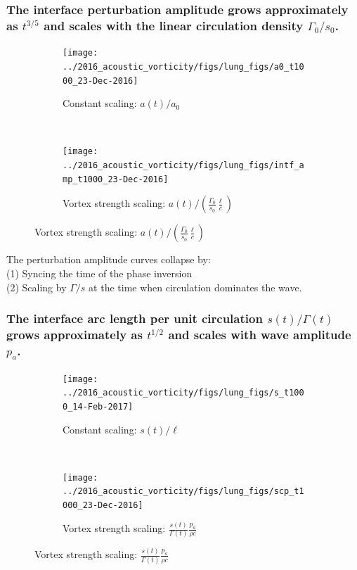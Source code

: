 %
%
\begin{frame}
  \frametitle{The interface perturbation amplitude grows approximately as $t^{3/5}$ and scales with the linear circulation density $\Gamma_0/s_0$.}
  \begin{figure}
    \centering
    \begin{subfigure}[t]{0.45\textwidth}
      \centering
      \texttt{[image: ../2016\_acoustic\_vorticity/figs/lung\_figs/a0\_t1000\_23-Dec-2016]}
      \caption{\label{fig:trapz_interface_t1000} Constant scaling: $a(t)/a_0$}
    \end{subfigure}
    ~
    \begin{subfigure}[t]{0.45\textwidth}
      \centering
      \texttt{[image: ../2016\_acoustic\_vorticity/figs/lung\_figs/intf\_amp\_t1000\_23-Dec-2016]}
      \caption{Vortex strength scaling: $a(t)/\left(\frac{\Gamma_0}{s_0}\frac{\ell}{c}\right)$}
    \end{subfigure}
  \end{figure}
  The perturbation amplitude curves collapse by:\\
  (1) Syncing the time of the phase inversion\\ 
  (2) Scaling by $\Gamma / s$ at the time when circulation dominates the wave.
\end{frame}
%
%
\begin{frame}
  \frametitle{The interface arc length per unit circulation $s(t)/\Gamma(t)$ grows approximately as $t^{1/2}$ and scales with wave amplitude $p_a$.}
  \begin{figure}
    \centering
    \begin{subfigure}[t]{0.45\textwidth}
      \centering
      \texttt{[image: ../2016\_acoustic\_vorticity/figs/lung\_figs/s\_t1000\_14-Feb-2017]}
      \caption{\label{fig:trapz_interface_t1000} Constant scaling: $s(t)/\ell$}
    \end{subfigure}
    ~
    \begin{subfigure}[t]{0.45\textwidth}
      \centering
      \texttt{[image: ../2016\_acoustic\_vorticity/figs/lung\_figs/scp\_t1000\_23-Dec-2016]}
      \caption{Vortex strength scaling: $\frac{s(t)}{\Gamma(t)}\frac{p_a}{\rho c}$}
    \end{subfigure}
  \end{figure}
\end{frame}
% 
% 
